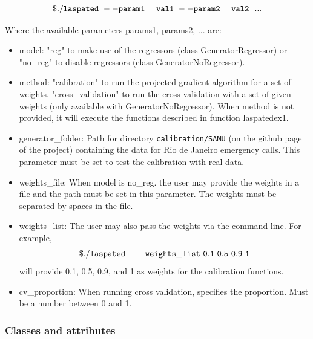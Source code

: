 \documentclass[article]{jss}
\begin{document}
{$$
{\tt{\$./laspated\text{ }--param1=val1\text{ }--param2=val2\text{ }\text{ ...}}}
$$

Where the available parameters params1, params2, ... are:

\begin{itemize}
    \item model: "reg" to make use of the regressors (class GeneratorRegressor) or "no\_reg" to disable regressors (class GeneratorNoRegressor).
    \item method: "calibration" to run the projected gradient algorithm for a set of weights. "cross\_validation" to run the cross validation with a set of given weights (only available with GeneratorNoRegressor). When method is not provided, it will
    execute the functions described
    in  function
     laspatedex1.
    \item generator\_folder: Path for
    directory {\tt{calibration/SAMU}}
    (on the github page of the project) containing the data for Rio de Janeiro emergency calls. This parameter must be set to test the calibration
    with real data.
    \item weights\_file: When model is no\_reg. the user may provide the weights in a file and the path must be set in this parameter. The weights must be separated by spaces in the file.
    \item weights\_list: The user may also pass the weights via the command line. For example, 
    $${\tt{\$./laspated\text{ }--weights\_list \text{ }0.1\text{ }0.5\text{ } 0.9\text{ } 1}}$$ will provide 0.1, 0.5, 0.9, and 1 as weights for the calibration functions.
    \item cv\_proportion: When running cross validation, specifies the proportion. Must be a number between 0 and 1.
\end{itemize}


\subsubsection{Classes and attributes}

}
\end{document}

